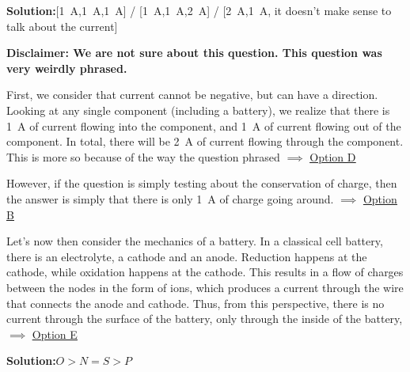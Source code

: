 \documentclass[11pt]{article}
\newcommand*\circled[1]{\tikz[baseline=(char.base)]{
		\node[shape=circle,draw,inner sep=2pt] (char) {#1};}}
\def\doubleunderline#1{\underline{\underline{#1}}}
\newcommand{\solution}[2]{\textbf{Solution:\hspace{1em}\circled{#1}}\hspace{1em}#2\hspace{1em}}
\begin{document}
\begin{enumerate}[label={[Q\arabic*]},itemsep={1em}]
		\pagebreak
		\item \solution{B/D/E}{[\SI{1}{\ampere},\SI{1}{\ampere},\SI{1}{\ampere}] / [\SI{1}{\ampere},\SI{1}{\ampere},\SI{2}{\ampere}] / [\SI{2}{\ampere},\SI{1}{\ampere}, it doesn't make sense to talk about the current]}
			
			\textbf{Disclaimer: We are not sure about this question. This question was very weirdly phrased.}
			
			First, we consider that current cannot be negative, but can have a direction. Looking at any single component (including a battery), we realize that there is \SI{1}{\ampere} of current flowing into the component, and \SI{1}{\ampere} of current flowing out of the component. In total, there will be \SI{2}{\ampere} of current flowing through the component. This is more so because of the way the question phrased $\implies$ \doubleunderline{Option D}
			
			However, if the question is simply testing about the conservation of charge, then the answer is simply that there is only \SI{1}{\ampere} of charge going around. $\implies$ \doubleunderline{Option B}
			
			Let's now then consider the mechanics of a battery. In a classical cell battery, there is an electrolyte, a cathode and an anode. Reduction happens at the cathode, while oxidation happens at the cathode. This results in a flow of charges between the nodes in the form of ions, which produces a current through the wire that connects the anode and cathode. Thus, from this perspective, there is no current through the surface of the battery, only through the inside of the battery, $\implies$ \doubleunderline{Option E}
		
		\item \solution{C}{$O>N=S>P$}
		

\end{enumerate}
\end{document}
